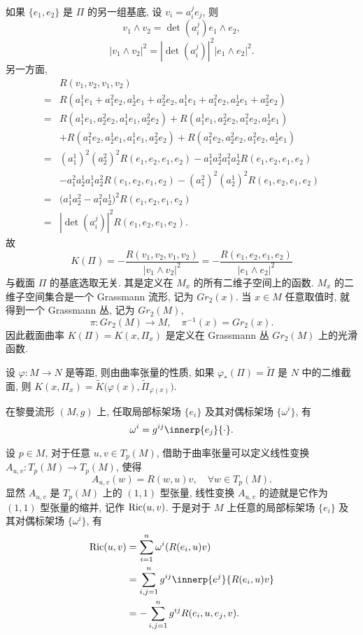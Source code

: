 如果 $\{e_1,e_2\}$ 是 $\Pi$ 的另一组基底, 设 $v_i=a_i^je_j$, 则
\[v_1\wedge v_2 = \det(a_i^j)e_1\wedge e_2,\]
\[|v_1\wedge v_2|^2 = |\det(a_i^j)|^2|e_1\wedge e_2|^2.\]
另一方面,
\begin{align*}
      & R(v_1,v_2,v_1,v_2) \\
  ={} & R(a_1^1e_1+a_1^2e_2, a_2^1e_1+a_2^2e_2, a_1^1e_1+a_1^2e_2, a_2^1e_1+a_2^2e_2) \\
  ={} & R(a_1^1e_1, a_2^2e_2, a_1^1e_1, a_2^2e_2) + R(a_1^1e_1, a_2^2e_2, a_1^2e_2, a_2^1e_1) \\
      & + R(a_1^2e_2, a_2^1e_1, a_1^1e_1, a_2^2e_2) + R(a_1^2e_2, a_2^2e_2, a_1^2e_2, a_2^1e_1) \\
  ={} & (a_1^1)^2(a_2^2)^2 R(e_1,e_2,e_1,e_2) - a_1^1a_2^2a_1^2a_2^1 R(e_1,e_2,e_1,e_2) \\
      & - a_1^2a_2^1a_1^1a_2^2 R(e_1,e_2,e_1,e_2) - (a_1^2)^2(a_2^1)^2 R(e_1,e_2,e_1,e_2) \\
  ={} & \bigl(a_1^1a_2^2 - a_1^2a_2^1\bigr)^2 R(e_1,e_2,e_1,e_2) \\
  ={} & |\det(a_i^j)|^2 R(e_1,e_2,e_1,e_2).
\end{align*}
故
\[K(\Pi) = -\frac{R(v_1,v_2,v_1,v_2)}{|v_1\wedge v_2|^2}
  = -\frac{R(e_1,e_2,e_1,e_2)}{|e_1\wedge e_2|^2}\]
与截面 $\Pi$ 的基底选取无关. 其是定义在 $M_x$ 的所有二维子空间上的函数.
$M_x$ 的二维子空间集合是一个 Grassmann 流形, 记为 $Gr_2(x)$.
当 $x\in M$ 任意取值时, 就得到一个 Grassmann 丛, 记为 $Gr_2(M)$,
\[\pi\colon Gr_2(M)\to M,\quad \pi^{-1}(x) = Gr_2(x).\]
因此截面曲率 $K(\Pi)=K(x,\Pi_x)$ 是定义在 Grassmann 丛 $Gr_2(M)$ 上的光滑函数.

设 $\varphi\colon M\to N$ 是等距, 则由曲率张量的性质, 
如果 $\varphi_*(\Pi)=\widetilde{\Pi}$ 是 $N$ 中的二维截面, 
则 $K(x,\Pi_x)=\widetilde{K}\bigl(\varphi(x),\widetilde{\Pi}_{\varphi(x)}\bigr)$.


在黎曼流形 $(M,g)$ 上, 任取局部标架场 $\{e_i\}$ 及其对偶标架场 $\{\omega^i\}$, 有
\[\omega^i = g^{ij}\innerp{e_j}{\cdot}.\]

设 $p\in M$, 对于任意 $u,v\in T_p(M)$, 借助于曲率张量可以定义线性变换
$A_{u,v}\colon T_p(M)\to T_p(M)$, 使得
\[A_{u,v}(w) = R(w,u)v,\quad \forall w\in T_p(M).\]
显然 $A_{u,v}$ 是 $T_p(M)$ 上的 $(1,1)$ 型张量, 
线性变换 $A_{u,v}$ 的迹就是它作为 $(1,1)$ 型张量的缩并, 记作 $\operatorname{Ric}(u,v)$.
于是对于 $M$ 上任意的局部标架场 $\{e_i\}$ 及其对偶标架场 $\{\omega^i\}$, 有
\begin{align*}
  \Ric(u,v)
  & = \sum_{i=1}^n \omega^i(R(e_i,u)v) \\
  & = \sum_{i,j=1}^n g^{ij} \innerp{e^j}{R(e_i,u)v} \\
  & = -\sum_{i,j=1}^n g^{ij} R(e_i,u,e_j,v).
\end{align*}

